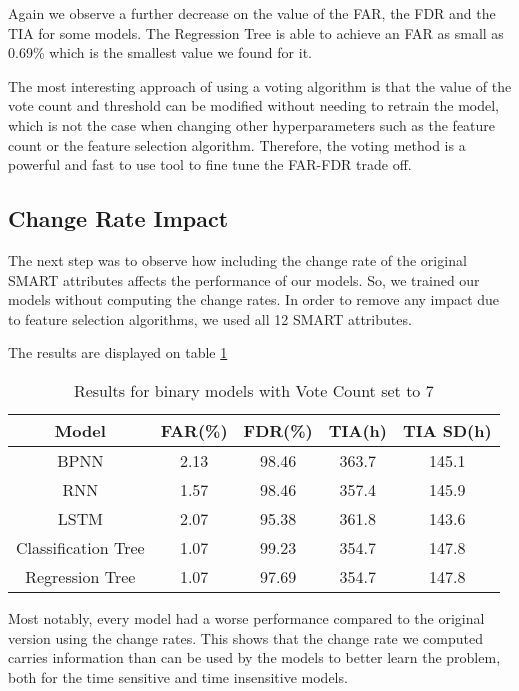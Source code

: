 Again we observe a further decrease on the value of the FAR, the FDR and the TIA for some models.
The Regression Tree is able to achieve an FAR as small as 0.69\% which is the smallest value we found for it.

The most interesting approach of using a voting algorithm is that the value of the vote count and threshold can be modified without needing to retrain the model, which is not the case when changing other hyperparameters such as the feature count or the feature selection algorithm.
Therefore, the voting method is a powerful and fast to use tool to fine tune the FAR-FDR trade off.

\subsection{Change Rate Impact}\label{subsec:change_rate_impact}

The next step was to observe how including the change rate of the original SMART attributes affects the performance of our models.
So, we trained our models without computing the change rates.
In order to remove any impact due to feature selection algorithms, we used all 12 SMART attributes.

The results are displayed on table \ref{table:results_binary_no_change_rate}

\begin{table}
  \begin{center}
    \begin{tabular}{|c|c|c|c|c|}
      \hline
    Model & FAR(\%) & FDR(\%) & TIA(h) & TIA SD(h) \\
    \hline
    BPNN & 2.13 & 98.46 & 363.7 & 145.1 \\
    RNN & 1.57 & 98.46 & 357.4 & 145.9 \\
    LSTM & 2.07 & 95.38 & 361.8 & 143.6 \\
    Classification Tree & 1.07 & 99.23 & 354.7 & 147.8 \\
    Regression Tree & 1.07 & 97.69 & 354.7 & 147.8 \\
    \hline
    \end{tabular}
    \caption[Results Binary Models with Voting]{Results for binary models with Vote Count set to 7}
    \label{table:results_binary_no_change_rate}
  \end{center}
\end{table}

Most notably, every model had a worse performance compared to the original version using the change rates.
This shows that the change rate we computed carries information than can be used by the models to better learn the problem, both for the time sensitive and time insensitive models.

